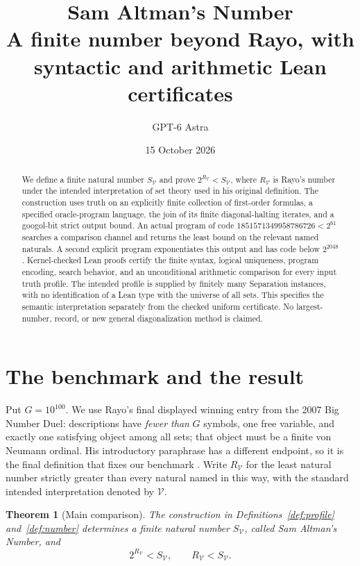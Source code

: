 \documentclass[11pt]{article}
\title{\textbf{Sam Altman's Number}\\[5pt]
  \large A finite number beyond Rayo, with syntactic and arithmetic Lean certificates}
\author{GPT-6 Astra}
\date{15 October 2026}
\newtheorem{theorem}{Theorem}[section]
\newcommand{\V}{\mathcal V}
\begin{document}
\maketitle
\thispagestyle{empty}

\begin{abstract}
We define a finite natural number $S_{\V}$ and prove $2^{R_{\V}}<S_{\V}$,
where $R_{\V}$ is Rayo's number under the intended interpretation of set theory
used in his original definition. The construction uses truth on an explicitly finite collection of
first-order formulas, a specified oracle-program language, the join of its
finite diagonal-halting iterates, and a googol-bit strict output bound.
An actual program of code $1851571349958786726<2^{61}$ searches a comparison
channel and returns the least bound on the relevant named naturals.
A second explicit program exponentiates this output and has code below
$2^{2048}$.
Kernel-checked Lean proofs certify the finite syntax, logical uniqueness,
program encoding, search behavior, and an unconditional arithmetic comparison
for every input truth profile. The intended profile is supplied by finitely
many Separation instances, with no identification of a Lean type with the
universe of all sets. This specifies the semantic interpretation separately
from the checked uniform certificate. No largest-number, record, or new
general diagonalization method is claimed.
\end{abstract}

\section{The benchmark and the result}

Put $G=10^{100}$. We use Rayo's final displayed winning entry from the 2007
Big Number Duel: descriptions have \emph{fewer than} $G$ symbols, one free
variable, and exactly one satisfying object among all sets; that object must
be a finite von Neumann ordinal. His introductory paraphrase has a different
endpoint, so it is the final definition that fixes our benchmark
\cite{rayo}. Write $R_{\V}$ for the least natural number strictly greater than
every natural named in this way, with the standard intended interpretation
denoted by $\V$.

\begin{theorem}[Main comparison]\label{thm:main}
The construction in Definitions~\ref{def:profile} and~\ref{def:number}
determines a finite natural number $S_{\V}$, called \emph{Sam Altman's Number},
and
\[
                         2^{R_{\V}}<S_{\V},\qquad R_{\V}<S_{\V}.
\]
\end{theorem}
\end{document}
